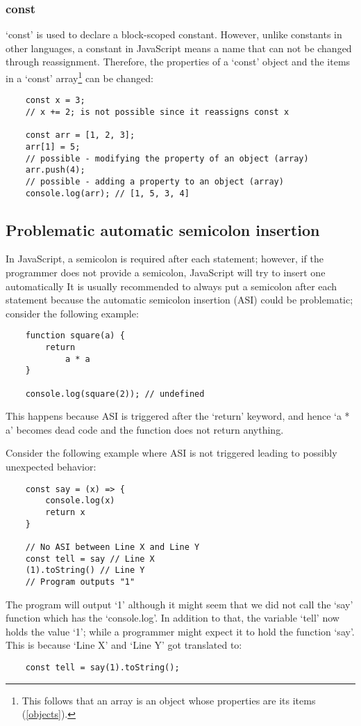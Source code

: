 \documentclass[11pt,a4paper]{article}
\begin{document}
\subsubsection{const}
`const' is used to declare a block-scoped constant.
However, unlike constants in other languages,
a constant in JavaScript means a name that can not be changed through reassignment.
Therefore, the properties of a `const' object and the items in a `const'
array\footnote{This follows that an array is an object whose properties are its items (\ref{objects}).}
can be changed:
\begin{verbatim}
    const x = 3;
    // x += 2; is not possible since it reassigns const x

    const arr = [1, 2, 3];
    arr[1] = 5;
    // possible - modifying the property of an object (array)
    arr.push(4);
    // possible - adding a property to an object (array)
    console.log(arr); // [1, 5, 3, 4]
\end{verbatim}

\subsection{Problematic automatic semicolon insertion}
In JavaScript, a semicolon is required after each statement; however,
if the programmer does not provide a semicolon, JavaScript will try to insert one automatically
It is usually recommended to always put a semicolon after each statement because
the automatic semicolon insertion (ASI) could be problematic; consider the following example:
\begin{verbatim}
    function square(a) {
        return
            a * a
    }

    console.log(square(2)); // undefined
\end{verbatim}
This happens because ASI is triggered after the `return' keyword,
and hence `a * a' becomes dead code and the function does not return anything.

Consider the following example where ASI is not triggered leading to possibly unexpected behavior:
\begin{verbatim}
    const say = (x) => {
        console.log(x)
        return x
    }

    // No ASI between Line X and Line Y
    const tell = say // Line X
    (1).toString() // Line Y
    // Program outputs "1"
\end{verbatim}
The program will output `1' although it might seem that we did not call the `say' function which has the `console.log'.
In addition to that, the variable `tell' now holds the value `1';
while a programmer might expect it to hold the function `say'.
This is because `Line X' and `Line Y' got translated to:
\begin{verbatim}
    const tell = say(1).toString();
\end{verbatim}
\end{document}
